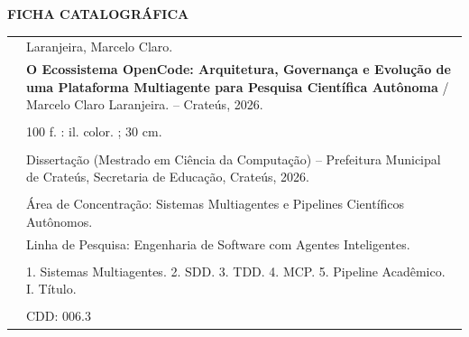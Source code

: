 \thispagestyle{empty}
\begin{center}
  {\large\bfseries FICHA CATALOGRÁFICA\par}
\end{center}
\vspace{1cm}

\begin{tabular}{p{3cm}p{11cm}}
  & \small Laranjeira, Marcelo Claro. \\
  & \textbf{O Ecossistema OpenCode: Arquitetura, Governança e Evolução de uma Plataforma Multiagente para Pesquisa Científica Autônoma} / Marcelo Claro Laranjeira. -- Crateús, 2026. \\
  & \\
  & 100 f. : il. color. ; 30 cm. \\
  & \\
  & Dissertação (Mestrado em Ciência da Computação) -- Prefeitura Municipal de Crateús, Secretaria de Educação, Crateús, 2026. \\
  & \\
  & Área de Concentração: Sistemas Multiagentes e Pipelines Científicos Autônomos. \\
  & Linha de Pesquisa: Engenharia de Software com Agentes Inteligentes. \\
  & \\
  & 1. Sistemas Multiagentes. 2. SDD. 3. TDD. 4. MCP. 5. Pipeline Acadêmico. I. Título. \\
  & \\
  & \hspace{3cm}CDD: 006.3 \\
\end{tabular}
\newpage
